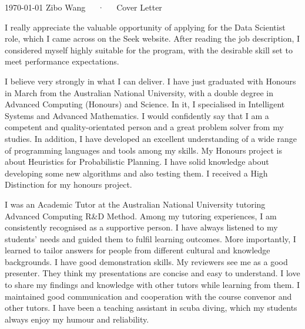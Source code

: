 \documentclass[11pt, a4paper]{awesome-cv}
\begin{document}
\makecvheader[R]

\makecvfooter
  {\today}
  {Zibo Wang~~~·~~~Cover Letter}
  {}

\makelettertitle

\begin{cvletter}

I really appreciate the valuable opportunity of applying for the Data Scientist role, which I came across on the Seek website. After reading the job description, I considered myself highly suitable for the program, with the desirable skill set to meet performance expectations.


I believe very strongly in what I can deliver. I have just graduated with Honours in March from the Australian National University, with a double degree in Advanced Computing (Honours) and Science. In it, I specialised in Intelligent Systems and Advanced Mathematics. I would confidently say that I am a competent and quality-orientated person and a great problem solver from my studies. In addition, I have developed an excellent understanding of a wide range of programming languages and tools among my skills. My Honours project is about Heuristics for Probabilistic Planning. I have solid knowledge about developing some new algorithms and also testing them. I received a High Distinction for my honours project.


I was an Academic Tutor at the Australian National University tutoring Advanced Computing R\&D Method. Among my tutoring experiences, I am consistently recognised as a supportive person. I have always listened to my students' needs and guided them to fulfil learning outcomes. More importantly, I learned to tailor answers for people from different cultural and knowledge backgrounds. I have good demonstration skills. My reviewers see me as a good presenter. They think my presentations are concise and easy to understand. I love to share my findings and knowledge with other tutors while learning from them. I maintained good communication and cooperation with the course convenor and other tutors. I have been a teaching assistant in scuba diving, which my students always enjoy my humour and reliability.


\end{cvletter}
\end{document}
